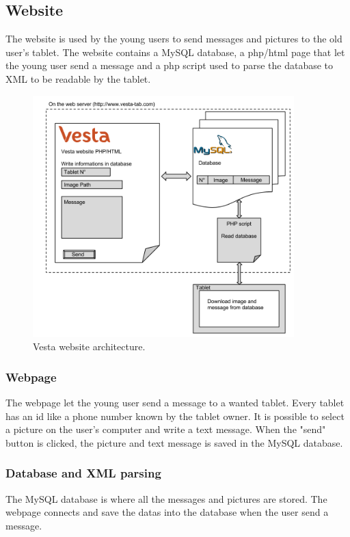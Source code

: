 \subsection{Website}
The website is used by the young users to send messages and pictures to the old user’s tablet.
The website contains a MySQL database, a php/html page that let the young user send a message and a php script used to parse the database to XML to be readable by the tablet.

\begin{figure}[!htb]
    \centering
    \includegraphics[width=0.9\textwidth,keepaspectratio]{chap/softFig/vesta_website2}
    \caption{Vesta website architecture.}
    \label{fig:web archi}
\end{figure}

\subsubsection{Webpage}
The webpage let the young user send a message to a wanted tablet. Every tablet has an id like a phone number known by the tablet owner. It is possible to select a picture on the user's computer and write a text message. When the "send" button is clicked, the picture and text message is saved in the MySQL database.
\subsubsection{Database and XML parsing}
The MySQL database is where all the messages and pictures are stored. The webpage connects and save the datas into the database when the user send a message.

